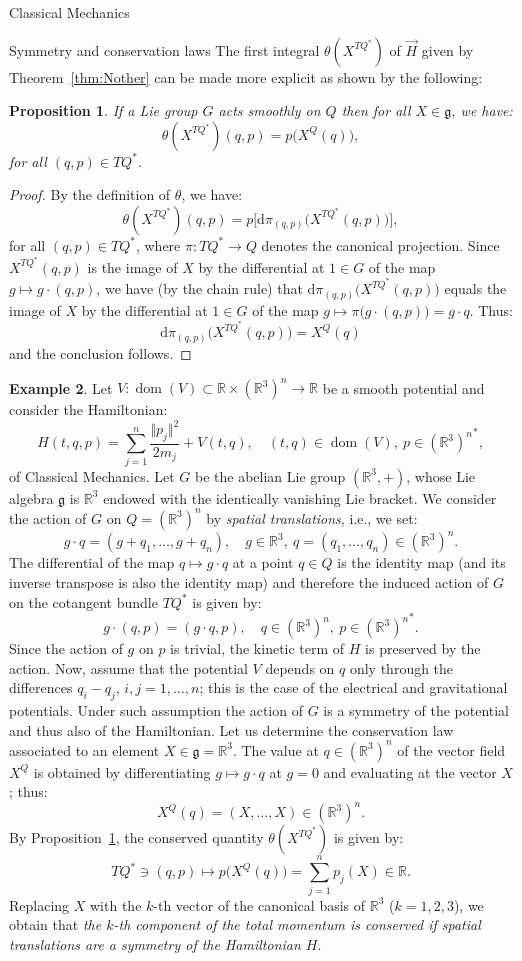 \documentclass[oneside,a4paper,11pt]{amsbook}
\newcommand{\R}{\mathds R}
\newcommand{\dd}{\mathrm d}
\DeclareMathOperator{\Dom}{dom}
\theoremstyle{remark}\newtheorem{exercise}{Exercise}[chapter]
\theoremstyle{plain}\newtheorem{teo}{Theorem}[section]
\theoremstyle{plain}\newtheorem{lem}[teo]{Lemma}
\theoremstyle{plain}\newtheorem{prop}[teo]{Proposition}
\theoremstyle{plain}\newtheorem{cor}[teo]{Corollary}
\theoremstyle{definition}\newtheorem{defin}[teo]{Definition}
\theoremstyle{remark}\newtheorem{rem}[teo]{Remark}
\theoremstyle{definition}\newtheorem{notation}[teo]{Notation}
\theoremstyle{definition}\newtheorem{convention}[teo]{Convention}
\theoremstyle{definition}\newtheorem{example}[teo]{Example}
\numberwithin{section}{chapter}
\numberwithin{equation}{section}
\begin{document}
\begin{chapter}{Classical Mechanics}
\begin{section}{Symmetry and conservation laws}
The first integral $\theta(X^{TQ^*})$ of $\vec H$ given by Theorem~\ref{thm:Nother} can be made more explicit as shown by the following:
\begin{prop}\label{thm:Nothersimple}
If a Lie group $G$ acts smoothly on $Q$ then for all $X\in\mathfrak g$, we have:
\[\theta(X^{TQ^*})(q,p)=p\big(X^Q(q)\big),\]
for all $(q,p)\in TQ^*$.
\end{prop}
\begin{proof}
By the definition of $\theta$, we have:
\[\theta(X^{TQ^*})(q,p)=p\big[\dd\pi_{(q,p)}\big(X^{TQ^*}(q,p)\big)\big],\]
for all $(q,p)\in TQ^*$, where $\pi:TQ^*\to Q$ denotes the canonical projection.
Since $X^{TQ^*}(q,p)$ is the image of $X$ by the differential at $1\in G$ of the map $g\mapsto g\cdot(q,p)$, we have
(by the chain rule) that $\dd\pi_{(q,p)}\big(X^{TQ^*}(q,p)\big)$ equals the image of $X$ by the differential at $1\in G$ of the map
$g\mapsto\pi\big(g\cdot(q,p)\big)=g\cdot q$. Thus:
\[\dd\pi_{(q,p)}\big(X^{TQ^*}(q,p)\big)=X^Q(q)\]
and the conclusion follows.
\end{proof}

\begin{example}\label{exa:translations}
Let $V:\Dom(V)\subset\R\times(\R^3)^n\to\R$ be a smooth potential and consider the Hamiltonian:
\[H(t,q,p)=\sum_{j=1}^n\frac{\Vert p_j\Vert^2}{2m_j}+V(t,q),\quad(t,q)\in\Dom(V),\ p\in{(\R^3)^n}^*,\]
of Classical Mechanics. Let $G$ be the abelian Lie group $(\R^3,+)$, whose Lie algebra $\mathfrak g$ is $\R^3$ endowed with the identically vanishing Lie bracket.
We consider the action of $G$ on $Q=(\R^3)^n$ by {\em spatial translations}, i.e., we set:
\[g\cdot q=(g+q_1,\ldots,g+q_n),\quad g\in\R^3,\ q=(q_1,\ldots,q_n)\in(\R^3)^n.\]
The differential of the map $q\mapsto g\cdot q$ at a point $q\in Q$ is the identity map (and its inverse transpose is also the identity map)
and therefore the induced action of $G$ on the cotangent bundle $TQ^*$ is given by:
\[g\cdot(q,p)=(g\cdot q,p),\quad q\in(\R^3)^n,\ p\in{(\R^3)^n}^*.\]
Since the action of $g$ on $p$ is trivial, the kinetic term of $H$ is preserved by the action. Now, assume that the potential $V$ depends on $q$
only through the differences $q_i-q_j$, $i,j=1,\ldots,n$; this is the case of the electrical and gravitational potentials. Under such assumption the action of $G$
is a symmetry of the potential and thus also of the Hamiltonian. Let us determine the conservation law associated to an element $X\in\mathfrak g=\R^3$.
The value at $q\in(\R^3)^n$ of the vector field $X^Q$ is obtained by differentiating $g\mapsto g\cdot q$ at $g=0$ and evaluating at the vector $X$; thus:
\[X^Q(q)=(X,\ldots,X)\in(\R^3)^n.\]
By Proposition~\ref{thm:Nothersimple}, the conserved quantity $\theta(X^{TQ^*})$ is given by:
\[TQ^*\ni(q,p)\longmapsto p\big(X^Q(q)\big)=\sum_{j=1}^np_j(X)\in\R.\]
Replacing $X$ with the $k$-th vector of the canonical basis of $\R^3$ ($k=1,2,3$), we obtain that {\em the $k$-th component of the total momentum is conserved
if spatial translations are a symmetry of the Hamiltonian $H$}.
\end{example}


\end{section}
\end{chapter}
\end{document}
